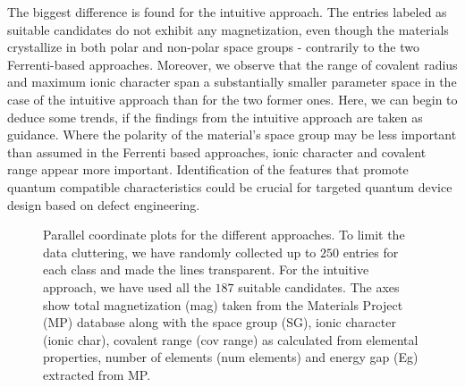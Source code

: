 \documentclass[superscriptaddress,unsortedaddress,
 amsmath,amssymb,
 aps,
]{revtex4-2}
\begin{document}
The biggest difference is found for the intuitive approach. The entries labeled as suitable candidates do not exhibit any magnetization, even though the materials crystallize in both polar and non-polar space groups - contrarily to the two Ferrenti-based approaches. Moreover, we observe that the range of covalent radius and maximum ionic character span a substantially smaller parameter space in the case of the intuitive approach than for the two former ones.  
Here, we can begin to deduce some trends, if the findings from the intuitive approach are taken as guidance. Where the polarity of the material's space group may be less important than assumed in the Ferrenti based approaches, ionic character and covalent range appear more important. 
Identification of the features that promote quantum compatible characteristics could be crucial for targeted quantum device design based on defect engineering. 

\begin{figure}[t] %
    \centering
    \begin{subfigure}{1\textwidth}
        \centering
          
    \end{subfigure}
    \begin{subfigure}{1\textwidth}
        \centering
          
    \end{subfigure}
    \begin{subfigure}{1\textwidth}
        \centering
          
    \end{subfigure}
    \caption{Parallel coordinate plots for the different approaches. To limit the data cluttering, we have randomly collected up to $250$ entries for each class and made the lines transparent. For the intuitive approach, we have used all the $187$ suitable candidates. The axes show total magnetization (mag) taken from the Materials Project (MP) database along with the space group (SG), ionic character (ionic char), covalent range (cov range) as calculated from elemental properties, number of elements (num elements) and energy gap (Eg) extracted from MP.} 
    \label{fig:parallel-coordinates-approaches}
\end{figure}
\end{document}
